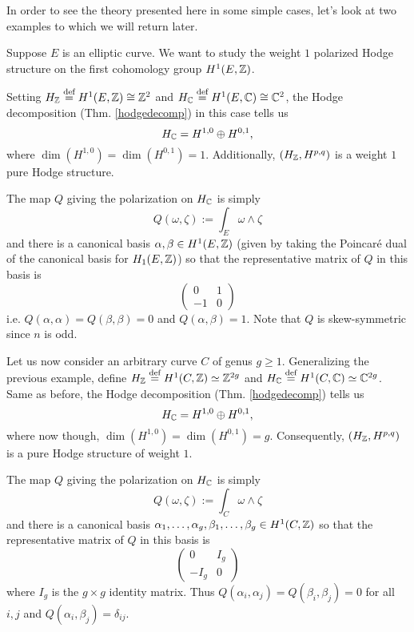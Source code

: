 \documentclass[../main.tex]{subfiles}
\begin{document}
In order to see the theory presented here in some simple cases, let's look at two examples to which we will return later.

\begin{es} \label{example-ell-curve} 

Suppose $E$ is an elliptic curve. We want to study the weight $1$ polarized Hodge structure on the first cohomology group $H^1(E,\mathbb{Z})$.

Setting $H_{\mathbb{Z}} \stackrel{\text{def}}{=} H^1(E,\mathbb{Z}) \cong \mathbb{Z}^2$ and $H_{\mathbb{C}} \stackrel{\text{def}}{=} H^1(E,\mathbb{C}) \cong \mathbb{C}^2$, the Hodge decomposition (Thm. \ref{hodgedecomp}) in this case tells us
\[ H_{\mathbb{C}} = H^{1,0} \oplus H^{0,1},\]
where $\dim (H^{1,0}) = \dim (H^{0,1}) = 1$. Additionally, $(H_{\mathbb{Z}},H^{p,q})$ is a weight $1$ pure Hodge structure.

The map $Q$ giving the polarization on $H_{\mathbb{C}}$ is simply
\[ 
Q(\omega,\zeta) := \int_E \omega \wedge \zeta
\]
and there is a canonical basis $\alpha,\beta \in H^1(E,\mathbb{Z})$ (given by taking the Poincar\'{e} dual of the canonical basis for $H_1(E,\mathbb{Z})$) so that the representative matrix of $Q$ in this basis is
\[\left( \begin{array}{cc} 0 & 1 \\ -1 & 0 \end{array} \right)\]
i.e. $Q(\alpha,\alpha) = Q(\beta,\beta) = 0$ and $Q(\alpha,\beta) = 1$. Note that $Q$ is skew-symmetric since $n$ is odd.
\end{es}

\begin{es}

Let us now consider an arbitrary curve $C$ of genus $g \geq 1$.
Generalizing the previous example, define $H_{\mathbb{Z}} \stackrel{\text{def}}{=} H^1(C,\mathbb{Z}) \simeq \mathbb{Z}^{2g}$ and $H_{\mathbb{C}} \stackrel{\text{def}}{=} H^1(C,\mathbb{C}) \simeq \mathbb{C}^{2g}$. Same as before, the Hodge decomposition (Thm. \ref{hodgedecomp}) tells us
\[ H_{\mathbb{C}} = H^{1,0} \oplus H^{0,1},\]
where now though, $\dim (H^{1,0}) = \dim (H^{0,1}) = g$. Consequently, $(H_{\mathbb{Z}},H^{p,q})$ is a pure Hodge structure of weight $1$.

The map $Q$ giving the polarization on $H_{\mathbb{C}}$ is simply
\[
Q(\omega,\zeta) := \int_C \omega \wedge \zeta\]
and there is a canonical basis $\alpha_1,\ldots,\alpha_g,\beta_1,\ldots,\beta_g \in H^1(C,\mathbb{Z})$ so that the representative matrix of $Q$ in this basis is
\[
\left( \begin{array}{cc} 0 & I_g \\ -I_g & 0 \end{array} \right) 
\]
where $I_g$ is the $g \times g$ identity matrix. Thus $Q(\alpha_i,\alpha_j) = Q(\beta_i,\beta_j) = 0$ for all $i,j$ and $Q(\alpha_i,\beta_j) = \delta_{ij}$.
\end{es}






\ifSubfilesClassLoaded{
}{} %
\end{document}
